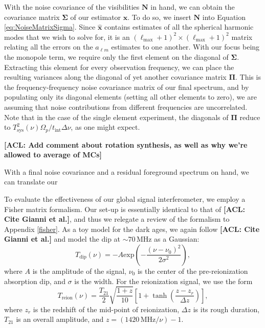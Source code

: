 \documentclass[twolcolumn,apj,iop,numberedappendix]{emulateapj}
\newcommand{\xhat}{\hat{\mathbf{x}}}
\newcommand{\N}{\mathbf{N}}
\newcommand{\acl}[1]{{\color{red} \textbf{[ACL:  #1]}}}
\begin{document}
With the noise covariance of the visibilities $\N$ in hand, we can obtain the covariance matrix $\boldsymbol \Sigma$ of our estimator $\xhat$. To do so, we insert $\N$ into Equation \eqref{eq:NoiseMatrixSigma}. Since $\xhat$ contains estimates of all the spherical harmonic modes that we wish to solve for,   it is an $(\ell_\textrm{max} +1)^2 \times (\ell_\textrm{max}+1)^2$ matrix relating all the errors on the $a_{\ell m}$ estimates to one another. With our focus being the monopole term, we require only the first element on the diagonal of $\boldsymbol \Sigma$. Extracting this element for every observation frequency, we can place the resulting variances along the diagonal of yet another covariance matrix $\boldsymbol \Pi$. This is the frequency-frequency noise covariance matrix of our final spectrum, and by populating only its diagonal elements (setting all other elements to zero), we are assuming that noise contributions from different frequencies are uncorrelated. Note that in the case of the single element experiment, the diagonals of $\boldsymbol \Pi$ reduce to $T^2_\textrm{sys}(\nu) \Omega_p / t_\textrm{int} \Delta \nu$, as one might expect.

\acl{Add comment about rotation synthesis, as well as why we're allowed to average of MCs}

With a final noise covariance and a residual foreground spectrum on hand, we can translate our 

To evaluate the effectiveness of our global signal interferometer, we employ a Fisher matrix formalism. Our set-up is essentially identical to that of \acl{Cite Gianni et al.}, and thus we relegate a review of the formalism to Appendix \ref{fisher}. As a toy model for the dark ages, we again follow \acl{Cite Gianni et al.} and model the dip at $\sim 70\,\textrm{MHz}$ as a Gaussian:
\begin{equation}
\label{eq:Dip}
T_\textrm{dip}(\nu) = -A \textrm{exp}\left ( -\frac{(\nu - \nu_0)^2}{2\sigma^2} \right ),
\end{equation}
where $A$ is the amplitude of the signal, $\nu_0$ is the center of the pre-reionization absorption dip, and $\sigma$ is the width. For the reionization signal, we use the form
\begin{equation}
\label{eq:Step}
T_\textrm{reion}(\nu) = \frac{T_{21}}{2} \sqrt{\frac{1+z}{10}}\left[ 1 +  \tanh \left( \frac{z-z_r}{\Delta z} \right)\right],
\end{equation}
where $z_r$ is the redshift of the mid-point of reionization, $\Delta z$ is its rough duration, $T_{21}$ is an overall amplitude, and $z = (1420 \,\textrm{MHz} / \nu) - 1$.
\end{document}
